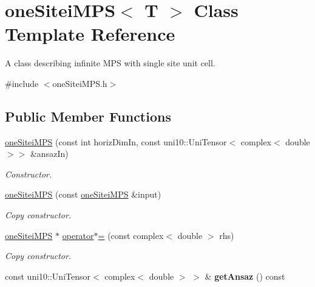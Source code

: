 \hypertarget{classoneSiteiMPS}{}\section{one\+Sitei\+M\+PS$<$ T $>$ Class Template Reference}
\label{classoneSiteiMPS}


A class describing infinite M\+PS with single site unit cell.  




{\ttfamily \#include $<$one\+Sitei\+M\+P\+S.\+h$>$}

\subsection*{Public Member Functions}
\begin{DoxyCompactItemize}
\item 
\hyperlink{classoneSiteiMPS_a810153594be9dfd91a97910bd0f0a0dc}{one\+Sitei\+M\+PS} (const int horiz\+Dim\+In, const uni10\+::\+Uni\+Tensor$<$ complex$<$ double $>$$>$ \&ansaz\+In)
\begin{DoxyCompactList}\small\item\em Constructor. \end{DoxyCompactList}\item 
\hyperlink{classoneSiteiMPS_a2487b0d1fcc99ba19a2d31de608bf32f}{one\+Sitei\+M\+PS} (const \hyperlink{classoneSiteiMPS}{one\+Sitei\+M\+PS} \&input)\hypertarget{classoneSiteiMPS_a2487b0d1fcc99ba19a2d31de608bf32f}{}\label{classoneSiteiMPS_a2487b0d1fcc99ba19a2d31de608bf32f}

\begin{DoxyCompactList}\small\item\em Copy constructor. \end{DoxyCompactList}\item 
\hyperlink{classoneSiteiMPS}{one\+Sitei\+M\+PS} $\ast$ \hyperlink{classoneSiteiMPS_ad80915102b316ab16826bb87f2ca73e1}{operator$\ast$=} (const complex$<$ double $>$ rhs)\hypertarget{classoneSiteiMPS_ad80915102b316ab16826bb87f2ca73e1}{}\label{classoneSiteiMPS_ad80915102b316ab16826bb87f2ca73e1}

\begin{DoxyCompactList}\small\item\em Copy constructor. \end{DoxyCompactList}\item 
const uni10\+::\+Uni\+Tensor$<$ complex$<$ double $>$ $>$ \& {\bfseries get\+Ansaz} () const \hypertarget{classoneSiteiMPS_ad94a57b8e2c00f4e651322b9a9bd70b9}{}\label{classoneSiteiMPS_ad94a57b8e2c00f4e651322b9a9bd70b9}


\end{DoxyCompactItemize}
